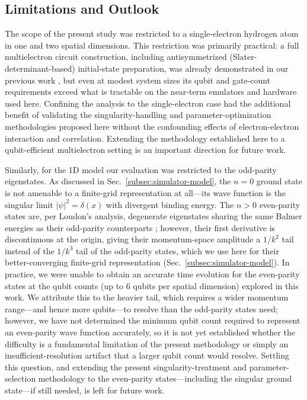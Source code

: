 \documentclass[aip, adv, amsmath, amssymb, reprint]{revtex4-1}
\begin{document}
\subsection{Limitations and Outlook}

The scope of the present study was restricted to a single-electron
hydrogen atom in one and two spatial dimensions. This restriction was
primarily practical: a full multielectron circuit construction,
including antisymmetrized (Slater-determinant-based) initial-state
preparation, was already demonstrated in our previous work
\cite{takahashi2024.doi:10.1021/acs.jctc.4c00708}, but even at modest
system sizes its qubit and gate-count requirements exceed what is
tractable on the near-term emulators and hardware used here. Confining
the analysis to the single-electron case had the additional benefit of
validating the singularity-handling and parameter-optimization
methodologies proposed here without the confounding effects of
electron-electron interaction and correlation. Extending the methodology
established here to a qubit-efficient multielectron setting is an
important direction for future work.

Similarly, for the 1D model our evaluation was restricted to the
odd-parity eigenstates. As discussed in Sec.~\ref{subsec:simulator-model},
the $n=0$ ground state is not amenable to a finite-grid representation at
all---its wave function is the singular limit $|\psi|^2=\delta(x)$ with
divergent binding energy. The $n>0$ even-parity states are, per Loudon's
analysis, degenerate eigenstates sharing the same
Balmer energies as their odd-parity counterparts
\cite{Loudon1959.10.1119/1.1934950}; however, their first derivative is
discontinuous at the origin, giving their momentum-space amplitude a
$1/k^2$ tail instead of the $1/k^3$ tail of the odd-parity states, which we
use here for their better-converging finite-grid representation
(Sec.~\ref{subsec:simulator-model}). In practice, we were unable to obtain
an accurate time evolution for the even-parity states at the qubit counts
(up to 6 qubits per spatial dimension) explored in this work. We attribute
this to the heavier tail, which requires a wider momentum range---and
hence more qubits---to resolve than the odd-parity states need; however,
we have not determined the minimum qubit count required to
represent an even-parity wave function accurately, so it is not yet
established whether the difficulty is a fundamental limitation of the
present methodology or simply an insufficient-resolution artifact that a
larger qubit count would resolve. Settling this question, and extending
the present singularity-treatment and parameter-selection methodology to
the even-parity states---including the singular ground state---if still
needed, is left for future work.
\end{document}
